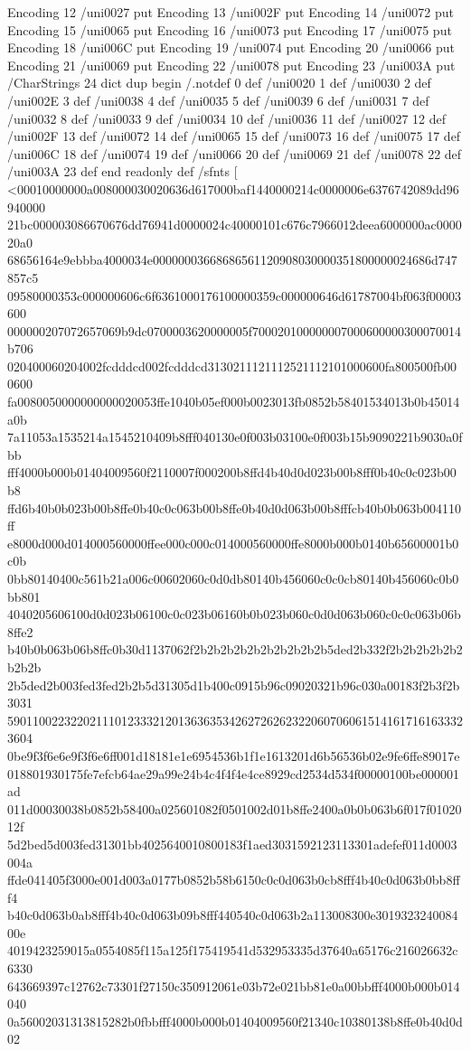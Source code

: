 Encoding 12 /uni0027 put
Encoding 13 /uni002F put
Encoding 14 /uni0072 put
Encoding 15 /uni0065 put
Encoding 16 /uni0073 put
Encoding 17 /uni0075 put
Encoding 18 /uni006C put
Encoding 19 /uni0074 put
Encoding 20 /uni0066 put
Encoding 21 /uni0069 put
Encoding 22 /uni0078 put
Encoding 23 /uni003A put
/CharStrings 24 dict dup begin
/.notdef 0 def
/uni0020 1 def
/uni0030 2 def
/uni002E 3 def
/uni0038 4 def
/uni0035 5 def
/uni0039 6 def
/uni0031 7 def
/uni0032 8 def
/uni0033 9 def
/uni0034 10 def
/uni0036 11 def
/uni0027 12 def
/uni002F 13 def
/uni0072 14 def
/uni0065 15 def
/uni0073 16 def
/uni0075 17 def
/uni006C 18 def
/uni0074 19 def
/uni0066 20 def
/uni0069 21 def
/uni0078 22 def
/uni003A 23 def
end readonly def
/sfnts [
<00010000000a008000030020636d617000baf1440000214c0000006e6376742089dd96940000
21bc000003086670676dd76941d0000024c40000101c676c7966012deea6000000ac000020a0
68656164e9ebbba4000034e00000003668686561120908030000351800000024686d747857c5
09580000353c000000606c6f6361000176100000359c000000646d61787004bf063f00003600
000000207072657069b9dc0700003620000005f700020100000007000600000300070014b706
020400060204002fcdddcd002fcdddcd3130211121112521112101000600fa800500fb000600
fa0080050000000000020053ffe1040b05ef000b0023013fb0852b58401534013b0b45014a0b
7a11053a1535214a1545210409b8fff040130e0f003b03100e0f003b15b9090221b9030a0fbb
fff4000b000b01404009560f2110007f000200b8ffd4b40d0d023b00b8fff0b40c0c023b00b8
ffd6b40b0b023b00b8ffe0b40c0c063b00b8ffe0b40d0d063b00b8fffcb40b0b063b004110ff
e8000d000d014000560000ffee000c000c014000560000ffe8000b000b0140b65600001b0c0b
0bb80140400c561b21a006c00602060c0d0db80140b456060c0c0cb80140b456060c0b0bb801
4040205606100d0d023b06100c0c023b06160b0b023b060c0d0d063b060c0c0c063b06b8ffe2
b40b0b063b06b8ffc0b30d1137062f2b2b2b2b2b2b2b2b2b2b5ded2b332f2b2b2b2b2b2b2b2b
2b5ded2b003fed3fed2b2b5d31305d1b400c0915b96c09020321b96c030a00183f2b3f2b3031
5901100223220211101233321201363635342627262623220607060615141617161633323604
0be9f3f6e6e9f3f6e6ff001d18181e1e6954536b1f1e1613201d6b56536b02e9fe6ffe89017e
018801930175fe7efcb64ae29a99e24b4c4f4f4e4ce8929cd2534d534f00000100be000001ad
011d00030038b0852b58400a025601082f0501002d01b8ffe2400a0b0b063b6f017f0102012f
5d2bed5d003fed31301bb4025640010800183f1aed3031592123113301adefef011d0003004a
ffde041405f3000e001d003a0177b0852b58b6150c0c0d063b0cb8fff4b40c0d063b0bb8fff4
b40c0d063b0ab8fff4b40c0d063b09b8fff440540c0d063b2a113008300e301932324008400e
4019423259015a0554085f115a125f175419541d532953335d37640a65176c216026632c6330
643669397c12762c73301f27150c350912061e03b72e021bb81e0a00bbfff4000b000b014040
0a56002031313815282b0fbbfff4000b000b01404009560f21340c10380138b8ffe0b40d0d02
